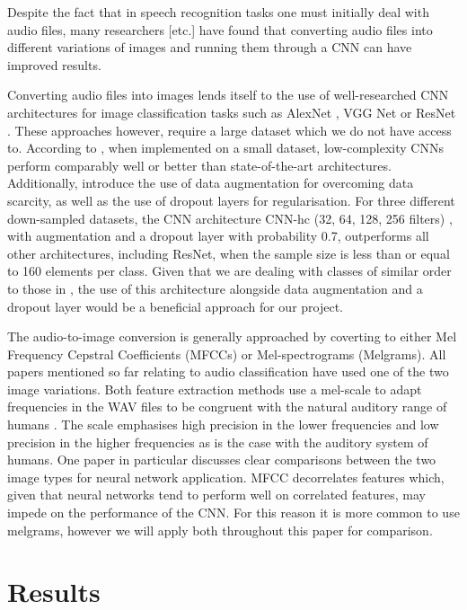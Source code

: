 \documentclass[11pt,a4paper,twoside]{article}
\begin{document}
Despite the fact that in speech recognition tasks one must initially deal with audio files, many researchers \cite{AudioSignals, SimpleSpeech, 7952132}[etc.] have found that converting audio files into different variations of images and running them through a CNN can have improved results. 

Converting audio files into images lends itself to the use of well-researched CNN architectures for image classification tasks such as AlexNet \cite{Alex_Net}, VGG Net \cite{VGG_Net} or ResNet \cite{Res_Net}. These approaches however, require a large dataset which we do not have access to. According to \cite{SmallData}, when implemented on a small dataset, low-complexity CNNs perform comparably well or better than state-of-the-art architectures. Additionally, \cite{SmallData, EnvSound} introduce the use of data augmentation for overcoming data scarcity, as well as the use of dropout layers for regularisation. For three different down-sampled datasets, the CNN architecture CNN-hc (32, 64, 128, 256 filters) \cite{SmallData}, with augmentation and a dropout layer with probability 0.7, outperforms all other architectures, including ResNet, when the sample size is less than or equal to 160 elements per class. Given that we are dealing with classes of similar order to those in \cite{SmallData}, the use of this architecture alongside data augmentation and a dropout layer would be a beneficial approach for our project.

The audio-to-image conversion is generally approached by coverting to either Mel Frequency Cepstral Coefficients (MFCCs) or Mel-spectrograms (Melgrams). All papers mentioned so far relating to audio classification \cite{EnvSound, 7952132, AudioSignals, SimpleSpeech} have used one of the two image variations. Both feature extraction methods use a mel-scale to adapt frequencies in the WAV files to be congruent with the natural auditory range of humans \cite{SimpleSpeech}. The scale emphasises high precision in the lower frequencies and low precision in the higher frequencies as is the case with the auditory system of humans\cite{MusicGenre}. One paper in particular \cite{SimpleSpeech} discusses clear comparisons between the two image types for neural network application. MFCC decorrelates features which, given that neural networks tend to perform well on correlated features, may impede on the performance of the CNN. For this reason it is more common to use melgrams, however we will apply both throughout this paper for comparison. 
\section{Results}
\end{document}
